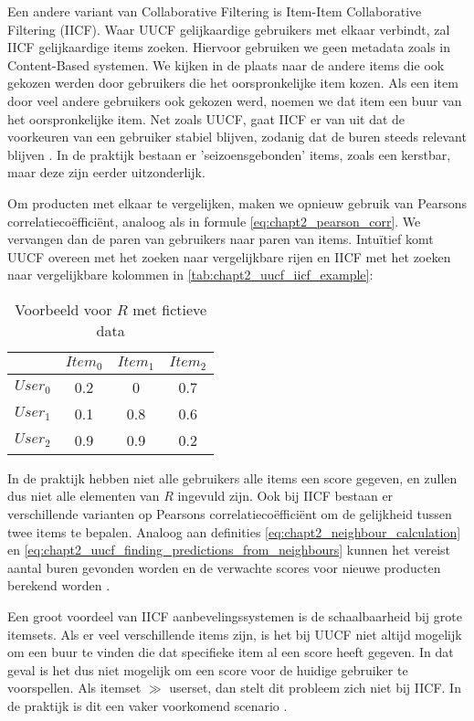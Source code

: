 Een andere variant van Collaborative Filtering is Item-Item Collaborative Filtering (IICF). Waar UUCF gelijkaardige gebruikers met elkaar verbindt, zal IICF gelijkaardige items zoeken. \cite{IICF_original_paper} Hiervoor gebruiken we geen metadata zoals in Content-Based systemen. We kijken in de plaats naar de andere items die ook gekozen werden door gebruikers die het oorspronkelijke item kozen. Als een item door veel andere gebruikers ook gekozen werd, noemen we dat item een buur van het oorspronkelijke item. Net zoals UUCF, gaat IICF er van uit dat de voorkeuren van een gebruiker stabiel blijven, zodanig dat de buren steeds relevant blijven \cite{cursus_hs9}. In de praktijk bestaan er 'seizoensgebonden' items, zoals een kerstbar, maar deze zijn eerder uitzonderlijk.

Om producten met elkaar te vergelijken, maken we opnieuw gebruik van Pearsons correlatiecoëfficiënt, analoog als in formule \ref{eq:chapt2_pearson_corr}. We vervangen dan de paren van gebruikers naar paren van items.
Intuïtief komt UUCF overeen met het zoeken naar vergelijkbare rijen en IICF met het zoeken naar vergelijkbare kolommen in \autoref{tab:chapt2_uucf_iicf_example}:

\begin{table}[H]
\centering
\begin{tabular}{c|ccc}
         & $Item_0$ & $Item_1$ & $Item_2$ \\ \hline
$User_0$ & 0.2      & 0        & 0.7      \\
$User_1$ & 0.1      & 0.8      & 0.6      \\
$User_2$ & 0.9      & 0.9      & 0.2     
\end{tabular}
\caption{Voorbeeld voor $R$ met fictieve data}
\label{tab:chapt2_uucf_iicf_example}
\end{table}

In de praktijk hebben niet alle gebruikers alle items een score gegeven, en zullen dus niet alle elementen van $R$ ingevuld zijn. Ook bij IICF bestaan er verschillende varianten op Pearsons correlatiecoëfficiënt om de gelijkheid tussen twee items te bepalen. Analoog aan definities \ref{eq:chapt2_neighbour_calculation} en \ref{eq:chapt2_uucf_finding_predictions_from_neighbours} kunnen het vereist aantal buren gevonden worden en de verwachte scores voor nieuwe producten berekend worden \cite{IICF_original_paper}.

Een groot voordeel van IICF aanbevelingssystemen is de schaalbaarheid bij grote itemsets. Als er veel verschillende items zijn, is het bij UUCF niet altijd mogelijk om een buur te vinden die dat specifieke item al een score heeft gegeven. In dat geval is het dus niet mogelijk om een score voor de huidige gebruiker te voorspellen. Als itemset $\gg$ userset, dan stelt dit probleem zich niet bij IICF. In de praktijk is dit een vaker voorkomend scenario \cite{recsys_handbook}.


